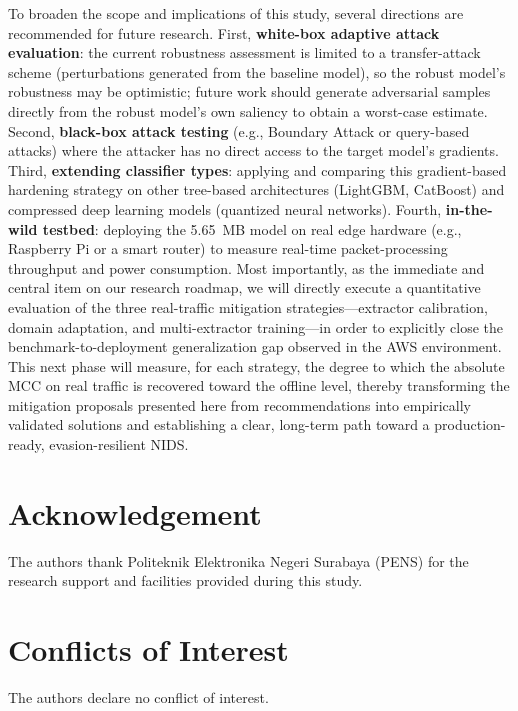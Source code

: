 \documentclass[11pt, a4paper]{article}
\begin{document}
To broaden the scope and implications of this study, several directions are recommended for future research. First, \textbf{white-box adaptive attack evaluation}: the current robustness assessment is limited to a transfer-attack scheme (perturbations generated from the baseline model), so the robust model's robustness may be optimistic; future work should generate adversarial samples directly from the robust model's own saliency to obtain a worst-case estimate. Second, \textbf{black-box attack testing} (e.g., Boundary Attack or query-based attacks) where the attacker has no direct access to the target model's gradients. Third, \textbf{extending classifier types}: applying and comparing this gradient-based hardening strategy on other tree-based architectures (LightGBM, CatBoost) and compressed deep learning models (quantized neural networks). Fourth, \textbf{in-the-wild testbed}: deploying the 5.65~MB model on real edge hardware (e.g., Raspberry Pi or a smart router) to measure real-time packet-processing throughput and power consumption. Most importantly, as the immediate and central item on our research roadmap, we will directly execute a quantitative evaluation of the three real-traffic mitigation strategies---extractor calibration, domain adaptation, and multi-extractor training---in order to explicitly close the benchmark-to-deployment generalization gap observed in the AWS environment. This next phase will measure, for each strategy, the degree to which the absolute MCC on real traffic is recovered toward the offline level, thereby transforming the mitigation proposals presented here from recommendations into empirically validated solutions and establishing a clear, long-term path toward a production-ready, evasion-resilient NIDS.

\section*{Acknowledgement}
The authors thank Politeknik Elektronika Negeri Surabaya (PENS) for the research support and facilities provided during this study.

\section*{Conflicts of Interest}
The authors declare no conflict of interest.
\end{document}
